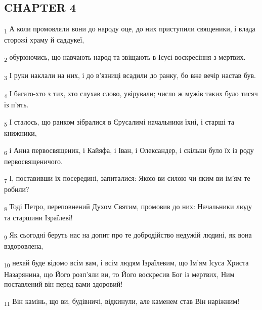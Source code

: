 \subsection{CHAPTER 4}
\begin{tcolorbox}
\textsubscript{1} А коли промовляли вони до народу оце, до них приступили священики, і влада сторожі храму й саддукеї,
\end{tcolorbox}
\begin{tcolorbox}
\textsubscript{2} обурюючись, що навчають народ та звіщають в Ісусі воскресіння з мертвих.
\end{tcolorbox}
\begin{tcolorbox}
\textsubscript{3} І руки наклали на них, і до в'язниці всадили до ранку, бо вже вечір настав був.
\end{tcolorbox}
\begin{tcolorbox}
\textsubscript{4} І багато-хто з тих, хто слухав слово, увірували; число ж мужів таких було тисяч із п'ять.
\end{tcolorbox}
\begin{tcolorbox}
\textsubscript{5} І сталось, що ранком зібралися в Єрусалимі начальники їхні, і старші та книжники,
\end{tcolorbox}
\begin{tcolorbox}
\textsubscript{6} і Анна первосвященик, і Кайяфа, і Іван, і Олександер, і скільки було їх із роду первосвященичого.
\end{tcolorbox}
\begin{tcolorbox}
\textsubscript{7} І, поставивши їх посередині, запиталися: Якою ви силою чи яким ви ім'ям те робили?
\end{tcolorbox}
\begin{tcolorbox}
\textsubscript{8} Тоді Петро, переповнений Духом Святим, промовив до них: Начальники люду та старшини Ізраїлеві!
\end{tcolorbox}
\begin{tcolorbox}
\textsubscript{9} Як сьогодні беруть нас на допит про те добродійство недужій людині, як вона вздоровлена,
\end{tcolorbox}
\begin{tcolorbox}
\textsubscript{10} нехай буде відомо всім вам, і всім людям Ізраїлевим, що Ім'ям Ісуса Христа Назарянина, що Його розп'яли ви, то Його воскресив Бог із мертвих, Ним поставлений він перед вами здоровий!
\end{tcolorbox}
\begin{tcolorbox}
\textsubscript{11} Він камінь, що ви, будівничі, відкинули, але каменем став Він наріжним!
\end{tcolorbox}
